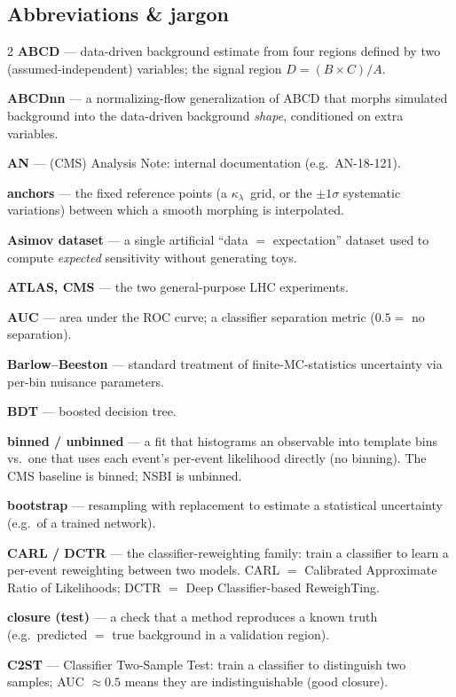 \documentclass[11pt]{article}
\newcommand{\kl}{\ensuremath{\kappa_\lambda}}
\begin{document}
\subsection*{Abbreviations \& jargon}
{\footnotesize\setlength{\parindent}{0pt}\setlength{\parskip}{2.5pt}
\begin{multicols}{2}
\textbf{ABCD} --- data-driven background estimate from four regions defined by two (assumed-independent) variables; the signal region $D=(B\times C)/A$.

\textbf{ABCDnn} --- a normalizing-flow generalization of ABCD that morphs simulated background into the data-driven background \emph{shape}, conditioned on extra variables.

\textbf{AN} --- (CMS) Analysis Note: internal documentation (e.g.\ AN-18-121).

\textbf{anchors} --- the fixed reference points (a \kl\ grid, or the $\pm1\sigma$ systematic variations) between which a smooth morphing is interpolated.

\textbf{Asimov dataset} --- a single artificial ``data $=$ expectation'' dataset used to compute \emph{expected} sensitivity without generating toys.

\textbf{ATLAS, CMS} --- the two general-purpose LHC experiments.

\textbf{AUC} --- area under the ROC curve; a classifier separation metric ($0.5=$ no separation).

\textbf{Barlow--Beeston} --- standard treatment of finite-MC-statistics uncertainty via per-bin nuisance parameters.

\textbf{BDT} --- boosted decision tree.

\textbf{binned / unbinned} --- a fit that histograms an observable into template bins vs.\ one that uses each event's per-event likelihood directly (no binning). The CMS baseline is binned; NSBI is unbinned.

\textbf{bootstrap} --- resampling with replacement to estimate a statistical uncertainty (e.g.\ of a trained network).

\textbf{CARL / DCTR} --- the classifier-reweighting family: train a classifier to learn a per-event reweighting between two models. CARL $=$ Calibrated Approximate Ratio of Likelihoods; DCTR $=$ Deep Classifier-based ReweighTing.

\textbf{closure (test)} --- a check that a method reproduces a known truth (e.g.\ predicted $=$ true background in a validation region).

\textbf{C2ST} --- Classifier Two-Sample Test: train a classifier to distinguish two samples; AUC $\approx0.5$ means they are indistinguishable (good closure).


\end{multicols}}
\end{document}
